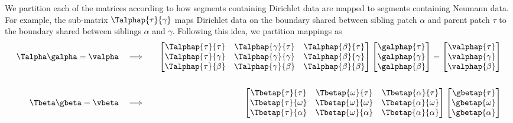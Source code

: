 We partition each of the matrices \Ti according to how segments containing Dirichlet data are mapped to segments containing Neumann data.  For example, the sub-matrix $\Talphap{\tau}{\gamma}$ maps Dirichlet data on the boundary shared between sibling patch $\alpha$  and parent patch $\tau$ to the boundary shared between siblings $\alpha$ and $\gamma$.  Following this idea, we partition mappings \Ti as
\begin{equation}
\begin{aligned}
\Talpha \galpha = \valpha \quad & \Longrightarrow  & \quad 
    \begin{bmatrix}
    \Talphap{\tau}{\tau}   &\Talphap{\gamma}{\tau}   & \Talphap{\beta}{\tau} \\
    \Talphap{\tau}{\gamma} &\Talphap{\gamma}{\gamma} & \Talphap{\beta}{\gamma} \\
    \Talphap{\tau}{\beta}  &\Talphap{\gamma}{\beta}  & \Talphap{\beta}{\beta} \\
    \end{bmatrix}
    \begin{bmatrix}
    \galphap{\tau} \\
    \galphap{\gamma} \\
    \galphap{\beta} \\
    \end{bmatrix}
    =
    \begin{bmatrix}
    \valphap{\tau} \\
    \valphap{\gamma} \\
    \valphap{\beta} \\
    \end{bmatrix} \\
&& \\
\Tbeta \gbeta = \vbeta \quad & \Longrightarrow  & \quad
    \begin{bmatrix}
        \Tbetap{\tau}{\tau}   & \Tbetap{\omega}{\tau}   & \Tbetap{\alpha}{\tau} \\
        \Tbetap{\tau}{\omega} & \Tbetap{\omega}{\omega} & \Tbetap{\alpha}{\omega} \\
        \Tbetap{\tau}{\alpha} & \Tbetap{\omega}{\alpha} & \Tbetap{\alpha}{\alpha} \\
    \end{bmatrix}
    \begin{bmatrix}
        \gbetap{\tau} \\
        \gbetap{\omega} \\
        \gbetap{\alpha} \\
    \end{bmatrix}

\end{aligned}
\end{equation}
